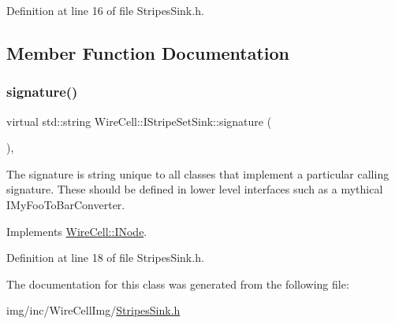 Definition at line 16 of file Stripes\+Sink.\+h.



\subsection{Member Function Documentation}
\mbox{\label{class_wire_cell_1_1_i_stripe_set_sink_aaa2c3a55c8466713a949936d192433a6}} 
\subsubsection{\texorpdfstring{signature()}{signature()}}
{\footnotesize\ttfamily virtual std\+::string Wire\+Cell\+::\+I\+Stripe\+Set\+Sink\+::signature (\begin{DoxyParamCaption}{ }\end{DoxyParamCaption})\hspace{0.3cm}{\ttfamily [inline]}, {\ttfamily [virtual]}}

The signature is string unique to all classes that implement a particular calling signature. These should be defined in lower level interfaces such as a mythical I\+My\+Foo\+To\+Bar\+Converter. 

Implements \hyperlink{class_wire_cell_1_1_i_node_a0b0763465adf5ba7febe8e378162b584}{Wire\+Cell\+::\+I\+Node}.



Definition at line 18 of file Stripes\+Sink.\+h.



The documentation for this class was generated from the following file\+:\begin{DoxyCompactItemize}
\item 
img/inc/\+Wire\+Cell\+Img/\hyperlink{_stripes_sink_8h}{Stripes\+Sink.\+h}\end{DoxyCompactItemize}

